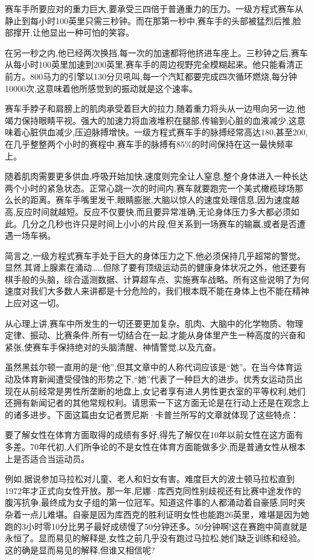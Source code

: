 赛车手所要应对的重力巨大,要承受三四倍于普通重力的压力。一级方程式赛车从静止到每小时100英里只需三秒钟。而在那第一秒中,赛车手的头部被猛烈后推,脸部撑开,让他显出一种可怕的笑容。

在另一秒之内,他已经两次换挡,每一次的加速都将他挤进车座上。三秒钟之后,赛车从每小时100英里加速到200英里,赛车手的周边视野完全模糊起来。他只能看清正前方。800马力的引擎以130分贝吼叫,每一个汽缸都要完成四次循环燃烧,每分钟10000次,这意味着他所感觉到的振动就是这个速率。

赛车手脖子和肩膀上的肌肉承受着巨大的拉力,随着重力将头从一边甩向另一边,他竭力保持眼睛平视。强大的加速力将血液堆积在腿部,传输到心脏的血液减少,这意味着心脏供血减少,压迫脉搏增快。一级方程式赛车手的脉搏经常高达180,甚至200,在几乎整整两个小时的赛程中,赛车手的脉搏有85\%的时间保持在这一最快频率上。

随着肌肉需要更多供血,呼吸开始加快,速度则完全让人窒息,整个身体进入一种长达两个小时的紧急状态。正常心跳一次的时间内,赛车就要跑完一个美式橄榄球场那么长的距离。赛车手嘴里发干,眼睛膨胀,大脑以惊人的速度处理信息,因为速度越高,反应时间就越短。反应不仅要快,而且要异常准确,无论身体压力多大都必须如此。几分之几秒也许只是时间上小小的片段,但关系到一场赛车的输赢,或者是否遭遇一场车祸。

简言之,一级方程式赛车手处于巨大的身体压力之下,他必须保持几乎超常的警觉。显然,其肾上腺素在涌动……但除了要有顶级运动员的健康身体状况之外，他还要有棋手般的头脑，综合遥测数据、计算超车点、实施赛车战略。所有这些说明了为何速度对我们大多数人来讲都是十分危险的，我们根本既不能在身体上也不能在精神上应对这一切。



从心理上讲,赛车中所发生的一切还要更加复杂。肌肉、大脑中的化学物质、物理定律、振动、比赛条件,所有一切结合在一起,才能从身体里产生一种高度的兴奋和紧张,使赛车手保持绝对的头脑清醒、神情警觉,以及亢奋。

虽然黑兹尔顿一直用的是“他”,但其文章中的人称代词应该是“她”。在当今体育运动及体育新闻遭受侵蚀的形势之下,“她”代表了一种巨大的进步。优秀女运动员出现在从前经常是男性所垄断的地盘上,女记者享有进人男性更衣室的平等权利,她们还拥有新闻记者的其他常规权利。请思索一下这方面无论是在行动上还是在观念上的诸多进步。下面这篇由女记者贾尼斯·卡普兰所写的文章就体现了这些特点：

要了解女性在体育方面取得的成绩有多好,得先了解仅在10年以前女性在这方面有多差。70年代初,人们所争论的不是女性在体育方面能做多少,而是普通女性从根本上是否适合当运动员。

例如,据说参加马拉松对儿童、老人和妇女有害。难度巨大的波士顿马拉松直到1972年才正式向女性开放。那一年,尼娜·库西克同性别歧视还有比赛中途发作的腹泻抗争,最终成为女子组的第一位冠军。知道这件事的人都涌动着自豪感,同时夹杂着一点儿难堪。自豪是因为库西克的胜利证明女性也能跑26英里，难堪是因为她跑的3小时零10分比男子最好成绩慢了50分钟还多。50分钟啊!这在赛跑中简直就是永恒了。显而易见的解释是,女性之前几乎没有跑过马拉松,她们缺乏训练和经验。这的确是显而易见的解释,但谁又相信呢?

